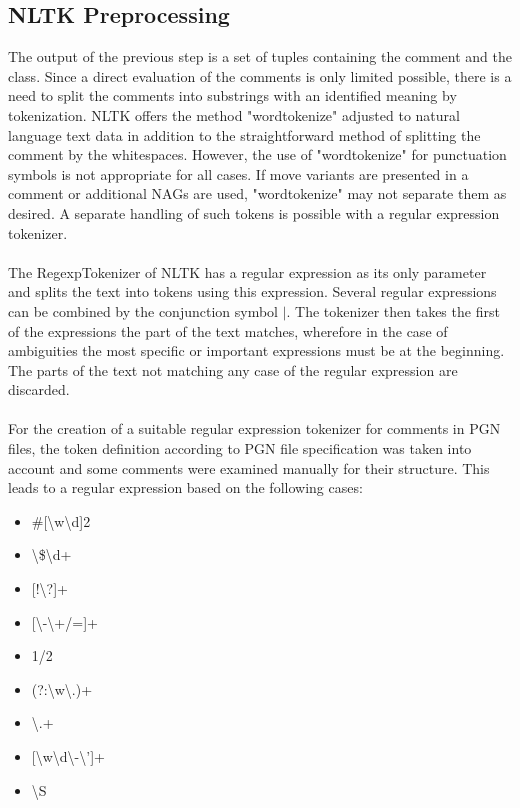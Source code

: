 \documentclass[article,type=msc,colorback,accentcolor=tud7b]{tudthesis}
\begin{document}
  \subsection{NLTK Preprocessing}
  \label{subsec:nltk_preprocessing}    
   The output of the previous step is a set of tuples containing the comment and the class. Since a direct evaluation of the comments is only limited possible, there is a need to split the comments into substrings with an identified meaning by tokenization. NLTK offers the method "word\textunderscore tokenize" adjusted to natural language text data in addition to the straightforward method of splitting the comment by the whitespaces. However, the use of "word\textunderscore tokenize" for punctuation symbols is not appropriate for all cases. If move variants are presented in a comment or additional NAGs are used, "word\textunderscore tokenize" may not separate them as desired. A separate handling of such tokens is possible with a regular expression tokenizer. \\\\
    The RegexpTokenizer of NLTK has a regular expression as its only parameter and splits the text into tokens using this expression. Several regular expressions can be combined by the conjunction symbol $|$. The tokenizer then takes the first of the expressions the part of the text matches, wherefore in the case of ambiguities the most specific or important expressions must be at the beginning. The parts of the text not matching any case of the regular expression are discarded. \\\\
    For the creation of a suitable regular expression tokenizer for comments in PGN files, the token definition according to PGN file specification was taken into account \autocite[chapter~7]{Edwards1994} and some comments were examined manually for their structure. This leads to a regular expression based on the following cases:
    \begin{itemize}
      \setlength\itemsep{0.4em}
      \item {} \#[\textbackslash w\textbackslash d]{2}
      \item {} \textbackslash\$\textbackslash d+
      \item {} [!\textbackslash?]+
      \item {} [\textbackslash-\textbackslash+/=]+
      \item {} 1/2
      \item {} (?:\textbackslash w\textbackslash.)+
      \item {} \textbackslash.+
      \item {} [\textbackslash w\textbackslash d\textbackslash-\textbackslash']+
      \item {} \textbackslash S
    \end{itemize}
\end{document}
